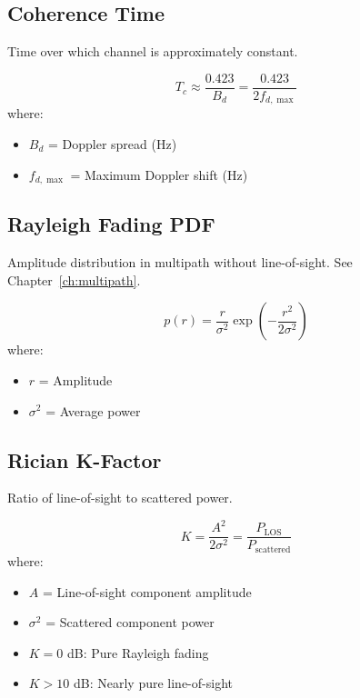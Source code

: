 \subsection{Coherence Time}
\label{sec:coherence-time}

Time over which channel is approximately constant.

\begin{equation}
T_c \approx \frac{0.423}{B_d} = \frac{0.423}{2f_{d,\max}}
\label{eq:coherence-time}
\end{equation}
where:
\begin{itemize}
\item $B_d$ = Doppler spread (Hz)
\item $f_{d,\max}$ = Maximum Doppler shift (Hz)
\end{itemize}

\subsection{Rayleigh Fading PDF}
\label{sec:rayleigh-fading}

Amplitude distribution in multipath without line-of-sight. See Chapter~\ref{ch:multipath}.

\begin{equation}
p(r) = \frac{r}{\sigma^2} \exp\left(-\frac{r^2}{2\sigma^2}\right)
\label{eq:rayleigh-pdf}
\end{equation}
where:
\begin{itemize}
\item $r$ = Amplitude
\item $\sigma^2$ = Average power
\end{itemize}

\subsection{Rician K-Factor}
\label{sec:rician-k}

Ratio of line-of-sight to scattered power.

\begin{equation}
K = \frac{A^2}{2\sigma^2} = \frac{P_{\text{LOS}}}{P_{\text{scattered}}}
\label{eq:rician-k}
\end{equation}
where:
\begin{itemize}
\item $A$ = Line-of-sight component amplitude
\item $\sigma^2$ = Scattered component power
\item $K = 0$ dB: Pure Rayleigh fading
\item $K > 10$ dB: Nearly pure line-of-sight
\end{itemize}

